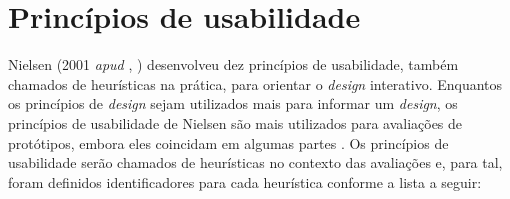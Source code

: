   \section{Princípios de usabilidade}
    
    Nielsen (2001 \textit{apud} \citeauthor{preece}, \citeyear{preece}) desenvolveu dez princípios de usabilidade, também chamados de
    heurísticas na prática, para orientar o \textit{design} interativo. Enquantos os princípios de \textit{design} sejam utilizados
    mais para informar um \textit{design}, os princípios de usabilidade de Nielsen são mais utilizados para avaliações de
    protótipos, embora eles coincidam em algumas partes \cite{preece}. Os princípios de usabilidade serão chamados de heurísticas
    no contexto das avaliações e, para tal, foram definidos identificadores para cada heurística conforme a lista a seguir:
    
